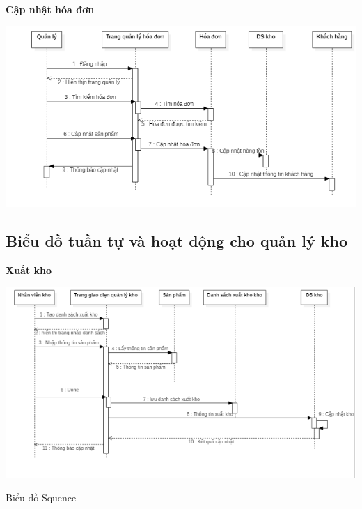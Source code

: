 \documentclass{article}
\begin{document}
\pagebreak
\fontsize{14}{20}\selectfont\textbf{Cập nhật hóa đơn}

\includegraphics[scale = 0.8]{10.png}

\pagebreak

\pagebreak
\fontsize{14}{20}\selectfont\subsection{Biểu đồ tuần tự và hoạt động cho quản lý kho}
  \fontsize{14}{20}\selectfont\textbf{Xuất kho}

\centering
\includegraphics[scale=0.8]{20.png}\\
\fontsize{13}{20}\selectfont\caption{Biểu đồ Squence}\\
\end{document}
